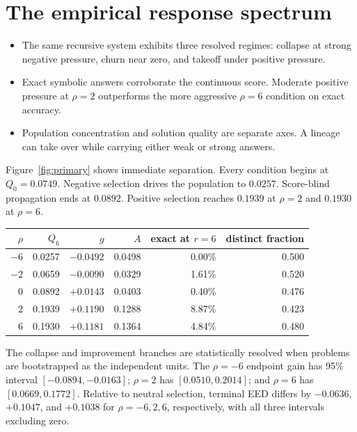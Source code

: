 \documentclass[10pt]{article}
\begin{document}
\section{The empirical response spectrum}

\begin{conceptbox}
\begin{itemize}[leftmargin=1.15em,itemsep=0.18em,topsep=0.05em]
\item The same recursive system exhibits three resolved regimes: collapse at strong negative pressure, churn near zero, and takeoff under positive pressure.
\item Exact symbolic answers corroborate the continuous score. Moderate positive pressure at $\rho=2$ outperforms the more aggressive $\rho=6$ condition on exact accuracy.
\item Population concentration and solution quality are separate axes. A lineage can take over while carrying either weak or strong answers.
\end{itemize}
\end{conceptbox}

Figure~\ref{fig:primary} shows immediate separation. Every condition begins at $Q_0=0.0749$. Negative selection drives the population to $0.0257$. Score-blind propagation ends at $0.0892$. Positive selection reaches $0.1939$ at $\rho=2$ and $0.1930$ at $\rho=6$.

\begin{center}
\small
\begin{tabular}{rrrrrr}
\hline
$\rho$ & $Q_6$ & $g$ & $A$ & exact at $r=6$ & distinct fraction\\
\hline
$-6$ & 0.0257 & $-0.0492$ & 0.0498 & 0.00\% & 0.500\\
$-2$ & 0.0659 & $-0.0090$ & 0.0329 & 1.61\% & 0.520\\
$0$  & 0.0892 & $+0.0143$ & 0.0403 & 0.40\% & 0.476\\
$2$  & 0.1939 & $+0.1190$ & 0.1288 & 8.87\% & 0.423\\
$6$  & 0.1930 & $+0.1181$ & 0.1364 & 4.84\% & 0.480\\
\hline
\end{tabular}
\end{center}

The collapse and improvement branches are statistically resolved when problems are bootstrapped as the independent units. The $\rho=-6$ endpoint gain has 95\% interval $[-0.0894,-0.0163]$; $\rho=2$ has $[0.0510,0.2014]$; and $\rho=6$ has $[0.0669,0.1772]$. Relative to neutral selection, terminal EED differs by $-0.0636$, $+0.1047$, and $+0.1038$ for $\rho=-6,2,6$, respectively, with all three intervals excluding zero.
\end{document}
